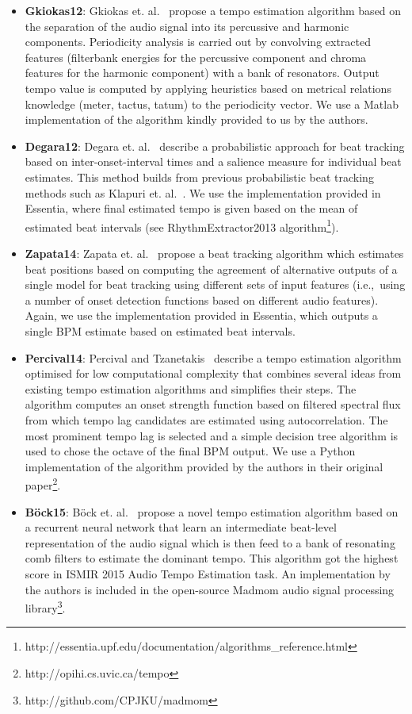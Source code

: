 \documentclass{article}
\begin{document}
\begin{itemize}
	\item \textbf{Gkiokas12}: Gkiokas et. al.~\cite{Gkiokas2012} propose a tempo estimation algorithm based on the separation of the audio signal into its percussive and harmonic components. Periodicity analysis is carried out by convolving extracted features (filterbank energies for the percussive component and chroma features for the harmonic component) with a bank of resonators. Output tempo value is computed by applying heuristics based on metrical relations knowledge (meter, tactus, tatum) to the periodicity vector. We use a Matlab implementation of the algorithm kindly provided to us by the authors.
	\item \textbf{Degara12}: Degara et. al.~\cite{Degara2012} describe a probabilistic approach for beat tracking based on inter-onset-interval times and a salience measure for individual beat estimates. This method builds from previous probabilistic beat tracking methods such as Klapuri et. al.~\cite{Klapuri2006}. We use the implementation provided in Essentia, where final estimated tempo is given based on the mean of estimated beat intervals (see RhythmExtractor2013 algorithm\footnote{http://essentia.upf.edu/documentation/algorithms\_reference.html}).
	\item \textbf{Zapata14}: Zapata et. al.~\cite{Zapata2014} propose a beat tracking algorithm which estimates beat positions based on computing the agreement of alternative outputs of a single model for beat tracking using different sets of input features (i.e.,~using a number of onset detection functions based on different audio features). Again, we use the implementation provided in Essentia, which outputs a single BPM estimate based on estimated beat intervals.
	\item \textbf{Percival14}: Percival and Tzanetakis~\cite{Percival2014} describe a tempo estimation algorithm optimised for low computational complexity that combines several ideas from existing tempo estimation algorithms and simplifies their steps. The algorithm computes an onset strength function based on filtered spectral flux from which tempo lag candidates are estimated using autocorrelation. The most prominent tempo lag is selected and a simple decision tree algorithm is used to chose the octave of the final BPM output. We use a Python implementation of the algorithm provided by the authors in their original paper\footnote{http://opihi.cs.uvic.ca/tempo}.
	\item \textbf{B\"{o}ck15}: B\"{o}ck et. al.~\cite{Sebastian2015} propose a novel tempo estimation algorithm based on a recurrent neural network that learn an intermediate beat-level representation of the audio signal which is then feed to a bank of resonating comb filters to estimate the dominant tempo. This algorithm got the highest score in ISMIR 2015 Audio Tempo Estimation task. An implementation by the authors is included in the open-source Madmom audio signal processing library\footnote{http://github.com/CPJKU/madmom}.

\end{itemize}
\end{document}
